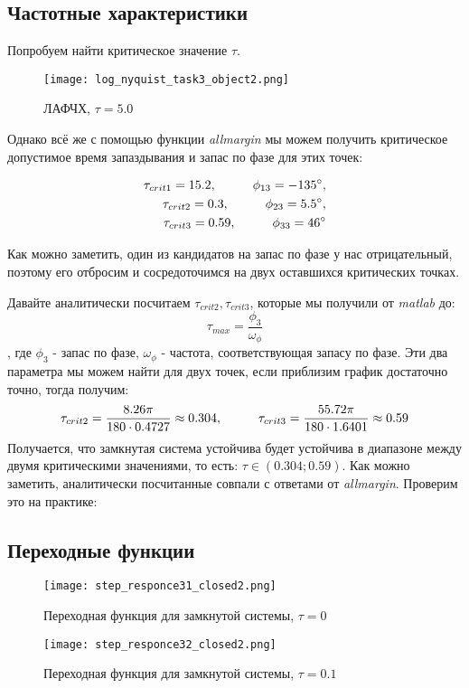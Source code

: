 \newpage
\subsection{Частотные характеристики}
Попробуем найти критическое значение $\tau$. 

\begin{figure}[ht]
    \centering
    \texttt{[image: log\_nyquist\_task3\_object2.png]}
    \caption{ЛАФЧХ, $\tau=5.0$}
\end{figure}

Однако всё же с помощью функции \textit{allmargin}  мы можем получить критическое допустимое время запаздывания и запас по фазе для этих точек:


$$
\begin{aligned}
    \tau_{crit1}=15.2, \hspace*{1cm} \phi_{13}=-135^\circ, \\   
    \tau_{crit2}=0.3, \hspace*{1cm} \phi_{23}=5.5^\circ, \\
    \tau_{crit3}=0.59, \hspace*{1cm} \phi_{33}=46^\circ
\end{aligned}
$$


Как можно заметить, один из кандидатов на запас по фазе у нас отрицательный, поэтому его отбросим и сосредоточимся на двух оставшихся критических точках.

Давайте аналитически посчитаем $\tau_{crit2}, \tau_{crit3}$, которые мы получили от \textit{matlab} до:
$$
\tau_{max} = \frac{\phi_3}{\omega_\phi}
$$, где $\phi_3$ - запас по фазе, $\omega_\phi$ - частота, соответствующая запасу по фазе. Эти два параметра мы можем найти для двух точек, если приблизим график достаточно точно, тогда получим:
$$
\tau_{crit2} = \frac{8.26\pi}{180\cdot 0.4727} \approx 0.304 , \hspace*{1cm} \tau_{crit3} = \frac{55.72\pi}{180\cdot 1.6401} \approx 0.59
$$
Получается, что замкнутая система устойчива будет устойчива в диапазоне между двумя критическими значениями, то есть: $\tau \in (0.304; 0.59)$.
Как можно заметить, аналитически посчитанные совпали с ответами от \textit{allmargin}. Проверим это на практике:

\newpage
\subsection{Переходные функции}
\begin{figure}[ht]
    \centering
    \texttt{[image: step\_responce31\_closed2.png]}
    \caption{Переходная функция для замкнутой системы, $\tau=0$}
\end{figure}
\begin{figure}[ht]
    \centering
    \texttt{[image: step\_responce32\_closed2.png]}
    \caption{Переходная функция для замкнутой системы, $\tau=0.1$}
\end{figure}

